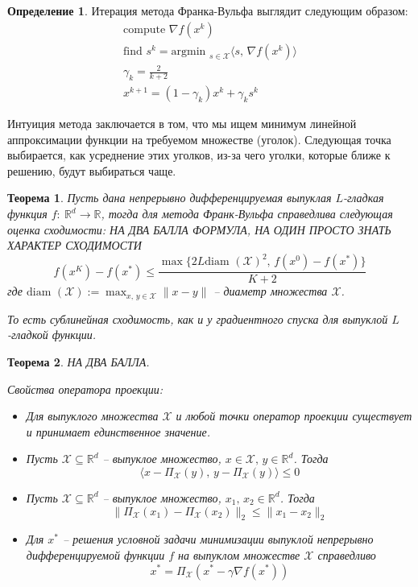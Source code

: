 \documentclass[a4paper,12pt]{article}
\renewcommand{\leq}{\ensuremath{\leqslant}}
\theoremstyle{plain}
\newtheorem{theorem}{Теорема}[section]
\theoremstyle{definition}
\newtheorem{definition}{Определение}[section]
\theoremstyle{remark}
\begin{document}
\begin{definition}
	Итерация метода Франка-Вульфа выглядит следующим образом:
	\begin{align*}
		\text{compute }\nabla f(x^k)                                                          \\
		\text{find }s^k = \text{argmin }_{s \in \mathcal{X}}\langle s,\, \nabla f(x^k)\rangle \\
		\gamma_k = \frac{2}{k + 2}                                                            \\
		x^{k + 1} = (1 - \gamma_k)x^k + \gamma_ks^k
	\end{align*}
\end{definition}
Интуиция метода заключается в том, что мы ищем минимум линейной аппроксимации функции на требуемом множестве (уголок). Следующая точка выбирается, как усреднение этих уголков, из-за чего уголки, которые ближе к решению, будут выбираться чаще.

\begin{theorem}
	Пусть дана непрерывно дифференцируемая выпуклая $L$-гладкая функция $f :\: \mathbb{R}^d \to \mathbb{R}$, тогда для метода Франк-Вульфа справедлива следующая оценка сходимости: НА ДВА БАЛЛА ФОРМУЛА, НА ОДИН ПРОСТО ЗНАТЬ ХАРАКТЕР СХОДИМОСТИ
	\[
		f(x^K) - f(x^*) \leq \frac{\max\{2L\text{diam }(\mathcal{X})^2,\, f(x^0) - f(x^*)\}}{K + 2}
	\]
	где $\text{diam }(\mathcal{X}) := \max_{x,\, y \in \mathcal{X}} \|x - y\|$ -- диаметр множества $\mathcal{X}$.

	То есть сублинейная сходимость, как и у градиентного спуска для выпуклой $L$-гладкой функции.
\end{theorem}

\begin{theorem}
	НА ДВА БАЛЛА.

	Свойства оператора проекции:
	\begin{itemize}
		\item Для выпуклого множества $\mathcal{X}$ и любой точки оператор проекции существует и принимает единственное значение.
		\item Пусть $\mathcal{X} \subseteq \mathbb{R}^d$ -- выпуклое множество, $x \in \mathcal{X},\, y \in \mathbb{R}^d$. Тогда
		      \[
			      \langle x - \Pi_\mathcal{X}(y),\, y - \Pi_\mathcal{X}(y)\rangle \leq 0
		      \]
		\item Пусть $\mathcal{X} \subseteq \mathbb{R}^d$ -- выпуклое множество, $x_1,\,x_2 \in \mathbb{R}^d$. Тогда
		      \[
			      \|\Pi_\mathcal{X}(x_1) - \Pi_\mathcal{X}(x_2)\|_2 \leq \|x_1 - x_2\|_2
		      \]
		\item Для $x^*$ -- решения условной задачи минимизации выпуклой непрерывно дифференцируемой функции $f$ на выпуклом множестве $\mathcal{X}$ справедливо
		      \[
			      x^* = \Pi_\mathcal{X}(x^* - \gamma\nabla f(x^*))
		      \]
	\end{itemize}
\end{theorem}
\end{document}

